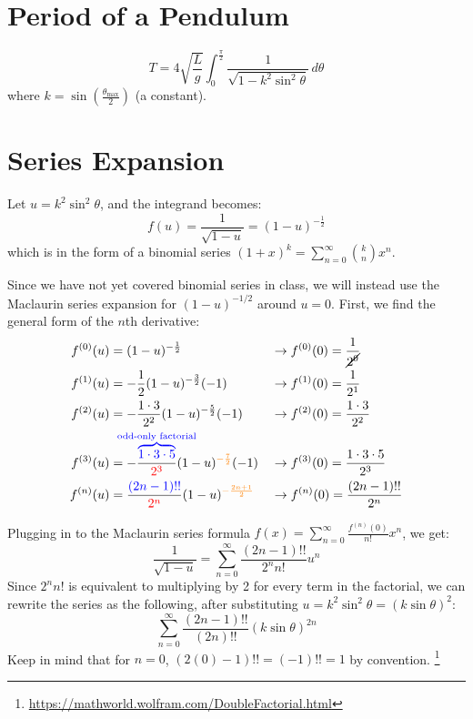 \documentclass[12pt]{article}
\begin{document}
\section{Period of a Pendulum}
\[
  T = 4 \sqrt{\frac{L}{g}} \int_{0}^{\frac{\pi}{2}} \frac{1}{\sqrt{1 - k^2
  \sin^2 \theta}} \, d\theta
\]
where $k = \sin\left(\frac{\theta_{\mathrm{max}}}{2}\right)$ (a constant).

\section{Series Expansion}
Let $u = k^2 \sin^2 \theta$, and the integrand becomes:
\[
  f(u) = \frac{1}{\sqrt{1 - u}} = (1 - u)^{-\frac{1}{2}}
\]
which is in the form of a binomial series $(1+x)^k =
\sum_{n=0}^{\infty} \binom{k}{n} x^n$.

Since we have not yet covered binomial series in class, we will instead
use the Maclaurin series expansion for $(1 - u)^{-1/2}$ around $u =
0$. First, we find the general form of the $n$th derivative:
\begin{align*}
  f^{(0)}(u) &= (1-u)^{-\frac{1}{2}} &&\rightarrow f^{(0)}(0) =
  \frac{1}{\cancel{2^0}} \\
  f^{(1)}(u) &= -\frac{1}{2} (1-u)^{-\frac{3}{2}} (-1) &&\rightarrow
  f^{(1)}(0) = \frac{1}{2^1} \\
  f^{(2)}(u) &= -\frac{1\cdot3}{2^2} (1-u)^{-\frac{5}{2}} (-1)
  &&\rightarrow f^{(2)}(0) = \frac{1\cdot3}{2^2} \\
  f^{(3)}(u) &= -\frac{\color{blue}\overbrace{1\cdot3\cdot5}^{\mathclap{\text{odd-only
  factorial}}}}{\color{red}2^3} (1-u)^{\color{orange} -\frac{7}{2}} (-1)
  &&\rightarrow f^{(3)}(0) =
  \frac{1\cdot3\cdot5}{2^3} \\
  f^{(n)}(u) &= \frac{{\color{blue}(2n-1)!!}}{{\color{red}2^n}} (1-u)^{\color{orange} -\frac{2n+1}{2}}
  &&\rightarrow f^{(n)}(0) = \frac{{(2n-1)!!}}{{2^n}}
\end{align*}

Plugging in to the Maclaurin series formula $f(x) =
\sum_{n=0}^{\infty} \frac{f^{(n)}(0)}{n!} x^n$, we get:
\[
  \frac{1}{\sqrt{1 - u}} = \sum_{n=0}^{\infty} \frac{
  (2n-1)!!}{2^n n!} u^n
\]
Since $2^n n!$ is equivalent to multiplying by 2 for every term in
the factorial, we can rewrite the series as the following, after
substituting $u = k^2 \sin^2 \theta = (k\sin\theta)^2$:
\[
  \sum_{n=0}^{\infty} \frac{ (2n-1)!!}{(2n)!!}
  {\left(k\sin\theta\right)}^{2n}
\]
Keep in mind that for $n = 0$, $(2(0) - 1)!! = (-1)!! = 1$ by
convention. \footnote{\url{https://mathworld.wolfram.com/DoubleFactorial.html}}
\end{document}

